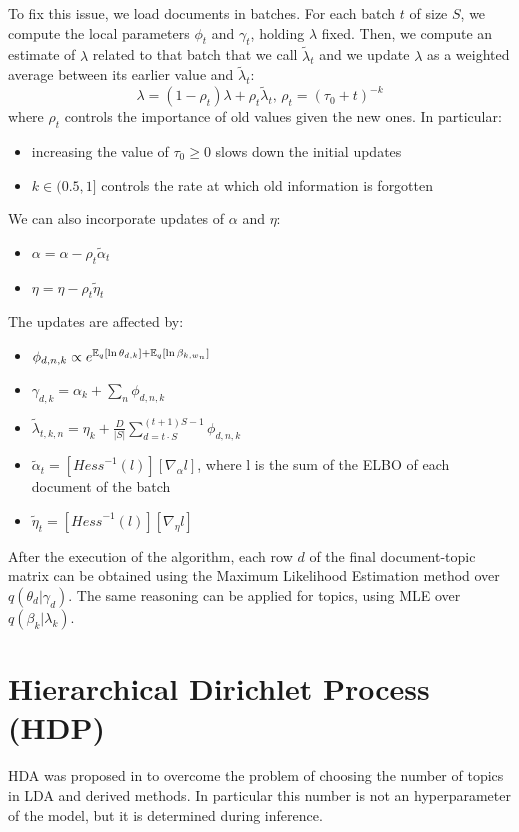 To fix this issue, we load documents in batches. For each batch $t$ of size $S$, we compute the local parameters $\phi_t$ and $\gamma_t$, holding $\lambda$ fixed.
Then, we compute an estimate of $\lambda$ related to that batch that we call $\tilde{\lambda}_t$
and we update $\lambda$ as a weighted average between its earlier value and $\tilde{\lambda}_t$:
\begin{equation*}
    \lambda = (1 - \rho_t) \lambda + \rho_t \tilde{\lambda}_t, \, \rho_t = (\tau_0 + t)^{-k}
\end{equation*}
where $\rho_t$ controls the importance of old values given the new ones. In particular:
\begin{itemize}
    \item increasing the value of $\tau_0 \geq 0$ slows down the initial updates
    \item $k \in (0.5, 1]$ controls the rate at which old information is forgotten
\end{itemize}

We can also incorporate updates of $\alpha$ and $\eta$:
\begin{itemize}
    \item $\alpha = \alpha - \rho_t \tilde{\alpha}_t$
    \item $\eta = \eta - \rho_t \tilde{\eta}_t$
\end{itemize}

The updates are affected by:
\begin{itemize}
    \item $\phi_{d,n,k} \propto e^{\operatorname*{\mathbb{E}}_q[\ln \theta_{d,k}] + \operatorname*{\mathbb{E}}_q[\ln \beta_{k, w_n}]}$
    \item $\gamma_{d,k} = \alpha_k + \sum_n \phi_{d,n,k}$
    \item $\tilde{\lambda}_{t,k,n} = \eta_k + \frac{D}{|S|} \sum_{d = t \cdot S}^{(t+1) S - 1} \phi_{d,n,k} $
    \item $\tilde{\alpha}_t = [\mathit{Hess}^{-1}(l)] [\nabla_{\alpha} l]$, where l is the sum of the ELBO of each document of the batch
    \item $\tilde{\eta}_t = [\mathit{Hess}^{-1}(l)] [\nabla_{\eta} l]$
\end{itemize}

After the execution of the algorithm, each row $d$ of the final document-topic matrix
can be obtained using the Maximum Likelihood Estimation method over $q(\theta_d | \gamma_d)$.
The same reasoning can be applied for topics, using MLE over $q(\beta_k | \lambda_k)$.


\section{Hierarchical Dirichlet Process (HDP)}
HDA was proposed in \cite{DBLP:journals/jmlr/WangPB11} to overcome the problem of choosing the number of topics in LDA and derived methods.
In particular this number is not an hyperparameter of the model, but it is determined during inference.
